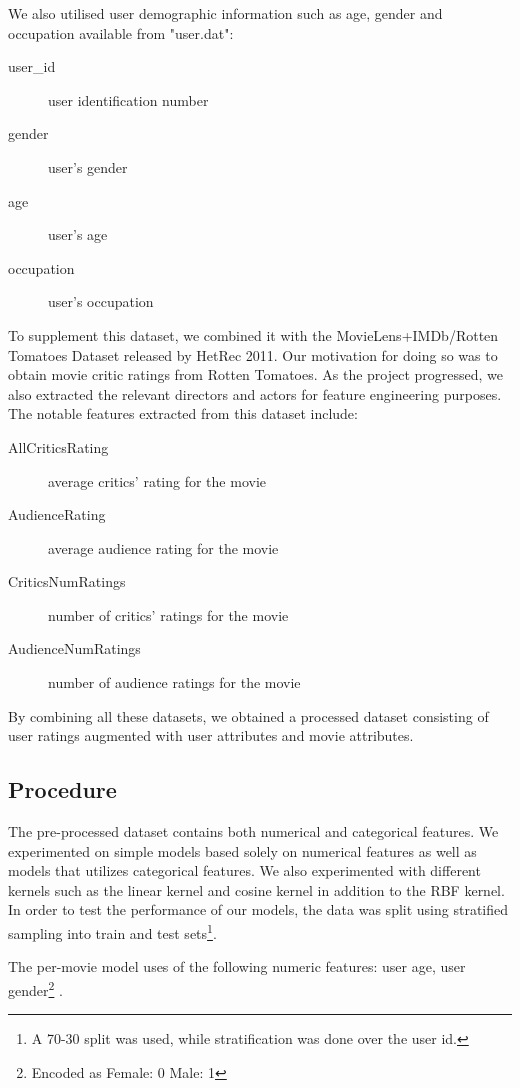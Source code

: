\documentclass[letterpaper]{article}
\begin{document}
We also utilised user demographic information such as age, gender and occupation available from "user.dat":

\begin{description}
	\item[user\_id] user identification number
	\item[gender] user's gender
	\item[age] user's age
	\item[occupation] user's occupation
\end{description}

To supplement this dataset, we combined it with the MovieLens+IMDb/Rotten Tomatoes Dataset released by HetRec 2011. Our motivation for doing so was to obtain movie critic ratings from Rotten Tomatoes. As the project progressed, we also extracted the relevant directors and actors for feature engineering purposes. The notable features extracted from this dataset include:

\begin{description}
	\item[AllCriticsRating] average critics' rating for the movie
	\item[AudienceRating] average audience rating for the movie
	\item[CriticsNumRatings] number of critics' ratings for the movie
	\item[AudienceNumRatings] number of audience ratings for the movie
\end{description}

By combining all these datasets, we obtained a processed dataset consisting of user ratings augmented with user attributes and movie attributes.

\subsection{Procedure}

The pre-processed dataset contains both numerical and categorical features. We experimented on simple models based solely on numerical features as well as models that utilizes categorical features. We also experimented with different kernels such as the linear kernel and cosine kernel in addition to the RBF kernel.  In order to test the performance of our models, the data was split using stratified sampling into train and test sets\footnote{A 70-30 split was used, while stratification was done over the user id.}.

The per-movie model uses of the following numeric features: user age, user gender\footnote{Encoded as Female: 0 Male: 1} .
\end{document}
